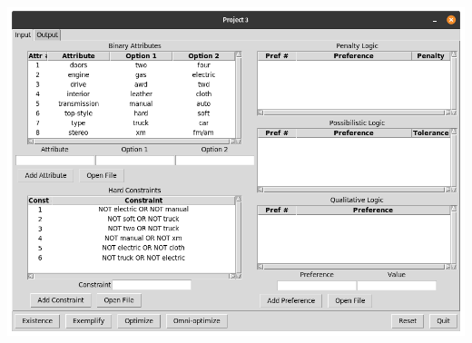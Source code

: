 \documentclass[titlepage]{article}
\begin{document}
\includegraphics[scale=0.3]{constraints_imported}\\
\end{document}
